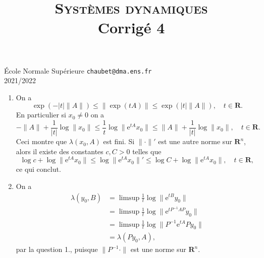 \documentclass[a4paper,12pt,openany]{article}
\title{\textsc{Syst\`emes dynamiques} \\ Corrig\'e 4}
\date{}
\author{}
\theoremstyle{plain}
\theoremstyle{definition}
\newcommand{\e}{\mathrm{e}}
\newcommand{\R}{\mathbf{R}}
\begin{document}
{\noindent \'Ecole Normale Sup\'erieure  \hfill \texttt{chaubet@dma.ens.fr}} \\
{2021/2022 \hfill}

{\let\newpage\relax\maketitle}
\maketitle

 \vspace{1.5mm} 


\begin{enumerate}
\item On a 
$$
\exp(-|t| \|A\|) \leq \|\exp(tA)\| \leq \exp(|t|\|A\|), \quad t \in \R.
$$
En particulier si $x_0 \neq 0$ on a 
$$
-\|A\| + \frac{1}{|t|} \log \|x_0\| \leq \frac{1}{t} \log \|\e^{tA}x_0\| \leq \|A\| + \frac{1}{|t|} \log \|x_0\|, \quad t \in \R.
$$
Ceci montre que $\lambda(x_0, A)$ est fini. Si $\|\cdot\|'$ est une autre norme sur $\R^n$, alors il existe des constantes $c,C > 0$ telles que
$$
\log c + \log \|\e^{tA}x_0\| \leq \log \|\e^{tA}x_0\|' \leq \log C + \log \|\e^{tA}x_0\|, \quad t \in \R,
$$
ce qui conclut.
\item On a 
$$
\begin{aligned}
\lambda(y_0, B) &= \limsup \frac{1}{t} \log \|\e^{tB}y_0\| \\
&= \limsup \frac{1}{t} \log \|\e^{tP^{-1}AP}y_0 \| \\
&= \limsup \frac{1}{t} \log \|P^{-1}\e^{tA}Py_0\| \\
&= \lambda(Py_0, A),
\end{aligned}
$$
par la question 1., puisque $\|P^{-1} \cdot\|$ est une norme sur $\R^n$.
\end{enumerate}
\end{document}
